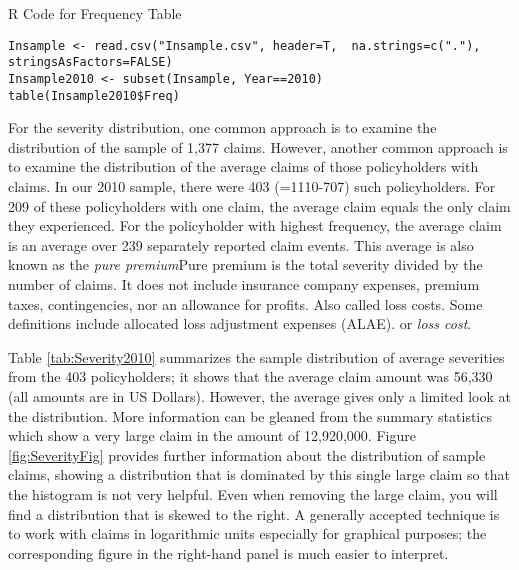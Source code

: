 \documentclass[]{book}
\theoremstyle{definition}
\theoremstyle{definition}
\theoremstyle{definition}
\theoremstyle{remark}
\begin{document}
R Code for Frequency Table

\hypertarget{display.T:Frequency.2}{}
\begin{verbatim}
Insample <- read.csv("Insample.csv", header=T,  na.strings=c("."), stringsAsFactors=FALSE)
Insample2010 <- subset(Insample, Year==2010)
table(Insample2010$Freq)
\end{verbatim}

For the severity distribution, one common approach is to examine the
distribution of the sample of 1,377 claims. However, another common
approach is to examine the distribution of the average claims of those
policyholders with claims. In our 2010 sample, there were 403
(=1110-707) such policyholders. For 209 of these policyholders with one
claim, the average claim equals the only claim they experienced. For the
policyholder with highest frequency, the average claim is an average
over 239 separately reported claim events. This average is also known as
the \emph{pure premium}{Pure premium is the total severity divided by
the number of claims. It does not include insurance company expenses,
premium taxes, contingencies, nor an allowance for profits. Also called
loss costs. Some definitions include allocated loss adjustment expenses
(ALAE).} or \emph{loss cost}.

Table \ref{tab:Severity2010} summarizes the sample distribution of
average severities from the 403 policyholders; it shows that the average
claim amount was 56,330 (all amounts are in US Dollars). However, the
average gives only a limited look at the distribution. More information
can be gleaned from the summary statistics which show a very large claim
in the amount of 12,920,000. Figure \ref{fig:SeverityFig} provides
further information about the distribution of sample claims, showing a
distribution that is dominated by this single large claim so that the
histogram is not very helpful. Even when removing the large claim, you
will find a distribution that is skewed to the right. A generally
accepted technique is to work with claims in logarithmic units
especially for graphical purposes; the corresponding figure in the
right-hand panel is much easier to interpret.
\end{document}
